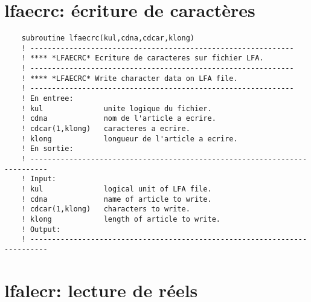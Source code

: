 \documentclass[10pt,french]{book}
\begin{document}
\section{lfaecrc: écriture de caractères}
\begin{verbatim}
	subroutine lfaecrc(kul,cdna,cdcar,klong)
	! -------------------------------------------------------------                
	! **** *LFAECRC* Ecriture de caracteres sur fichier LFA.
	! -------------------------------------------------------------                
	! **** *LFAECRC* Write character data on LFA file.
	! -------------------------------------------------------------                
	! En entree:
	! kul              unite logique du fichier.
	! cdna             nom de l'article a ecrire.
	! cdcar(1,klong)   caracteres a ecrire.
	! klong            longueur de l'article a ecrire.
	! En sortie:
	! --------------------------------------------------------------------------
	! Input:
	! kul              logical unit of LFA file.
	! cdna             name of article to write.
	! cdcar(1,klong)   characters to write.
	! klong            length of article to write.
	! Output:
	! --------------------------------------------------------------------------
\end{verbatim}
\section{lfalecr: lecture de réels}
 
 
 
\end{document}
